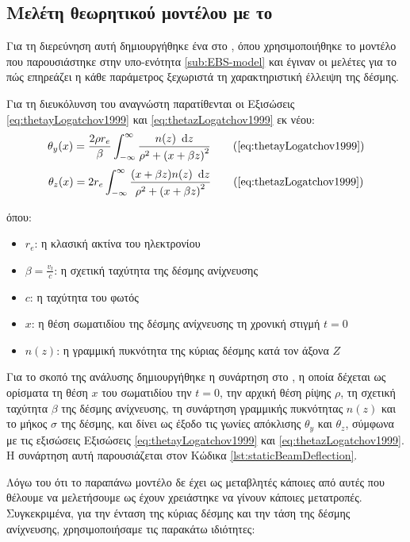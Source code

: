 \subsection{Μελέτη θεωρητικού μοντέλου με το } \label{sub:variable-analysis-MATLAB}
Για τη διερεύνηση αυτή δημιουργήθηκε ένα  στο , όπου χρησιμοποιήθηκε το μοντέλο που παρουσιάστηκε στην υπο-ενότητα \ref{sub:EBS-model} και έγιναν οι μελέτες για το πώς επηρεάζει η κάθε παράμετρος ξεχωριστά τη χαρακτηριστική έλλειψη της δέσμης. 

Για τη διευκόλυνση του αναγνώστη παρατίθενται οι Εξισώσεις \ref{eq:thetayLogatchov1999} και \ref{eq:thetazLogatchov1999} εκ νέου:
\begin{equation}
\theta_y (x) = \frac{2 \rho r_e}{\beta} \int_{-\infty}^{\infty}\frac{n(z) \dd z}{\rho^2 + \left(x+\beta z \right) ^2} \tag{\ref{eq:thetayLogatchov1999}} 
\end{equation}
\begin{equation}
\theta_z(x) = 2 r_e \int_{-\infty}^{\infty}\frac{(x+\beta z)n(z) \dd z}{\rho^2 + \left(x+\beta z \right) ^2}	\tag{\ref{eq:thetazLogatchov1999}} 
\end{equation}

όπου:
\begin{itemize}
\item $r_e$: η κλασική ακτίνα του ηλεκτρονίου
\item $\beta =\frac{v_t}{c}$: η σχετική ταχύτητα της δέσμης ανίχνευσης
\item $c$: η ταχύτητα του φωτός
\item $x$: η θέση σωματιδίου της δέσμης ανίχνευσης τη χρονική στιγμή $t=0$
\item $n(z)$: η γραμμική πυκνότητα της κύριας δέσμης κατά τον άξονα $Z$
\end{itemize} 

Για το σκοπό της ανάλυσης δημιουργήθηκε η συνάρτηση  στο , η οποία δέχεται ως ορίσματα τη θέση $x$ του σωματιδίου την $t = 0$, την αρχική θέση ρίψης $\rho$, τη σχετική ταχύτητα $\beta$ της δέσμης ανίχνευσης, τη συνάρτηση γραμμικής πυκνότητας $n(z)$ και το μήκος $\sigma$ της δέσμης, και δίνει ως έξοδο τις γωνίες απόκλισης $\theta_y$ και $\theta_z$, σύμφωνα με τις εξισώσεις Εξισώσεις \ref{eq:thetayLogatchov1999} και \ref{eq:thetazLogatchov1999}.
Η συνάρτηση αυτή παρουσιάζεται στον Κώδικα \ref{lst:staticBeamDeflection}.

Λόγω του ότι το παραπάνω μοντέλο δε έχει ως μεταβλητές κάποιες από αυτές που θέλουμε να μελετήσουμε ως έχουν χρειάστηκε να γίνουν κάποιες μετατροπές. 
Συγκεκριμένα, για την ένταση της κύριας δέσμης και την τάση της δέσμης ανίχνευσης, χρησιμοποιήσαμε τις παρακάτω ιδιότητες:

